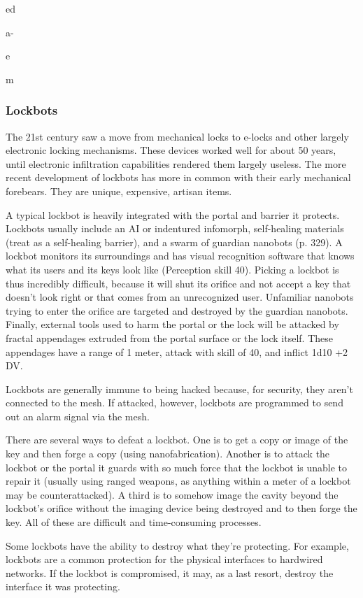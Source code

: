 ed

a-

e

m

\subsubsection{Lockbots}

The 21st century saw a move from mechanical 
locks to e-locks and other largely electronic locking 
mechanisms. These devices worked well for about 
50 years, until electronic infiltration  capabilities 
rendered them largely useless. The more recent development
of lockbots has more in common with
their early mechanical forebears. They are unique, 
expensive, artisan items.

A typical lockbot is heavily integrated with the 
portal and barrier it protects. Lockbots usually 
include an AI or indentured infomorph, self-healing 
materials (treat as a self-healing barrier), and a 
swarm of guardian nanobots (p. 329). A lockbot 
monitors its surroundings and has visual recognition
software that knows what its users and its keys
look like (Perception skill 40). Picking a lockbot is 
thus incredibly difficult, because it will shut its orifice
and not accept a key that doesn't look right or
that comes from an unrecognized user. Unfamiliar 
nanobots trying to enter the orifice are targeted and 
destroyed by the guardian nanobots. Finally, external
tools used to harm the portal or the lock will be
attacked by fractal appendages extruded from the 
portal surface or the lock itself. These appendages 
have a range of 1 meter, attack with skill of 40, and 
inflict 1d10 +2 DV.

Lockbots are generally immune to being hacked 
because, for security, they aren't connected to 
the mesh. If attacked, however, lockbots are programmed
to send out an alarm signal via the mesh.

There are several ways to defeat a lockbot. One 
is to get a copy or image of the key and then forge 
a copy (using nanofabrication). Another is to attack 
the lockbot or the portal it guards with so much 
force that the lockbot is unable to repair it (usually 
using ranged weapons, as anything within a meter 
of a lockbot may be counterattacked). A third is to 
somehow image the cavity beyond the lockbot's orifice
without the imaging device being destroyed and
to then forge the key. All of these are difficult and 
time-consuming processes.

Some lockbots have the ability to destroy what 
they're protecting. For example, lockbots are a 
common protection for the physical interfaces to 
hardwired networks. If the lockbot is compromised, 
it may, as a last resort, destroy the interface it was 
protecting.

